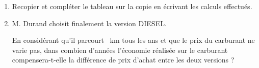 \medskip

\begin{enumerate}
\item Recopier et compléter le tableau sur la copie en écrivant les calculs effectués.
\item M. Durand choisit finalement la version DIESEL.

En considérant qu'il parcourt ~km tous les ans et que le prix du carburant ne varie pas, dans combien d'années l'économie réalisée sur le carburant compensera-t-elle la différence de prix d'achat entre les deux versions ?
\end{enumerate}

\bigskip


